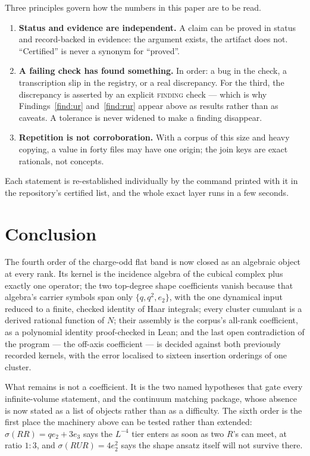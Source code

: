 \documentclass[11pt]{article}
\theoremstyle{definition}
\theoremstyle{remark}
\begin{document}
Three principles govern how the numbers in this paper are to be read.

\begin{enumerate}\itemsep3pt
\item \textbf{Status and evidence are independent.} A claim can be proved in
  status and record-backed in evidence: the argument exists, the artifact does
  not. ``Certified'' is never a synonym for ``proved''.
\item \textbf{A failing check has found something.} In order: a bug in the
  check, a transcription slip in the registry, or a real discrepancy. For the
  third, the discrepancy is asserted by an explicit \textsc{finding} check ---
  which is why Findings~\ref{find:ur} and~\ref{find:rur} appear above as
  results rather than as caveats. A tolerance is never widened to make a
  finding disappear.
\item \textbf{Repetition is not corroboration.} With a corpus of this size and
  heavy copying, a value in forty files may have one origin; the join keys are
  exact rationals, not concepts.
\end{enumerate}

Each statement is re-established individually by the command printed with it in
the repository's certified list, and the whole exact layer runs in a few
seconds.

\section{Conclusion}\label{sec:conclusion}

The fourth order of the charge-odd flat band is now closed as an algebraic
object at every rank. Its kernel is the incidence algebra of the cubical
complex plus exactly one operator; the two top-degree shape coefficients vanish
because that algebra's carrier symbols span only $\{q,q^2,e_2\}$, with the one
dynamical input reduced to a finite, checked identity of Haar integrals; every
cluster cumulant is a derived rational function of $N$; their assembly is the
corpus's all-rank coefficient, as a polynomial identity proof-checked in Lean;
and the last open contradiction of the program --- the off-axis coefficient ---
is decided against both previously recorded kernels, with the error localised
to sixteen insertion orderings of one cluster.

What remains is not a coefficient. It is the two named hypotheses that gate
every infinite-volume statement, and the continuum matching package, whose
absence is now stated as a list of objects rather than as a difficulty. The
sixth order is the first place the machinery above can be tested rather than
extended: $\sigma(RR)=qe_2+3e_3$ says the $L^{-4}$ tier enters as soon as two
$R$'s can meet, at ratio $1:3$, and $\sigma(RUR)=4e_2^2$ says the shape ansatz
itself will not survive there.
\end{document}
